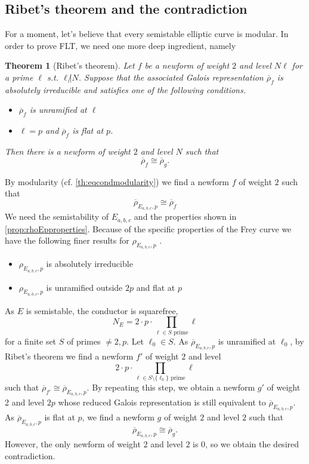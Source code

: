 \documentclass{article}
\theoremstyle{plain}%
\newtheorem{theorem}{Theorem}[section]
\theoremstyle{definition}
\theoremstyle{remark}
\begin{document}
\subsection{Ribet's theorem and the contradiction}
For a moment, let's believe that every semistable elliptic curve is modular.
In order to prove FLT, we need one more deep ingredient, namely
\begin{theorem}[Ribet's theorem]
    Let \(f\) be a newform of weight \(2\) and level \(N\ell\) for a prime \(\ell\) s.t. \(\ell\not | N\).
    Suppose that the associated Galois representation \(\overline{\rho}_f\) is absolutely irreducible
    and satisfies one of the following conditions.
    \begin{itemize}
        \item \(\overline{\rho}_f\) is unramified at \(\ell\)
        \item \(\ell = p\) and \(\overline{\rho}_f\) is flat at \(p\).
    \end{itemize}
    Then there is a newform of weight \(2\) and level \(N\) such that
    \[
        \overline{\rho}_f \cong \overline{\rho}_g.
    \]    
\end{theorem}
By modularity (cf. \cref{th:eqcondmodularity}) we find a newform \(f\) of weight \(2\) such that
\[
    \overline{\rho}_{E_{a,b,c}, p} \cong \overline{\rho}_f
\]
We need the semistability of \(E_{a,b,c}\) and the properties shown in \cref{prop:rhoEpproperties}.
Because of the specific properties of the Frey curve we have the following finer results for \(\rho_{E_{a,b,c}, p}\) 
\cite[see][chapter 1, theorem 3.1]{Cornell1997}.
\begin{itemize}
    \item \(\rho_{E_{a,b,c}, p}\) is absolutely irreducible
    \item \(\rho_{E_{a,b,c}, p}\) is unramified outside \(2p\) and flat at \(p\) %
\end{itemize} %
As \(E\) is semistable, the conductor is squarefree,
\[ 
    N_E = 2 \cdot p \cdot \prod_{\ell\in S \text{ prime}} \ell
\]
for a finite set \(S\) of primes \(\neq 2, p\).
Let \(\ell_0 \in S\). As \(\overline{\rho}_{E_{a,b,c}, p}\) is unramified at \(\ell_0\), 
by Ribet's theorem we find a newform \(f'\) of weight \(2\) and level
\[
    2 \cdot p \cdot \prod_{\ell\in S\setminus\{\ell_0\} \text{ prime}} \ell
\]
such that \(\overline{\rho}_{f'} \cong \overline{\rho}_{E_{a,b,c}, p}\).
By repeating this step, we obtain a newform \(g'\) of weight 2 and level \(2p\) whose reduced 
Galois representation is still equivalent to \(\overline{\rho}_{E_{a,b,c}, p}\). 
As \(\overline{\rho}_{E_{a,b,c}, p}\) is flat at \(p\), 
we find a newform \(g\) of weight \(2\) and level \(2\) such that
\[
    \overline{\rho}_{E_{a,b,c}, p} \cong \overline{\rho}_g.    
\]
However, the only newform of weight \(2\) and level \(2\) is 0, so we obtain the desired contradiction.
\end{document}
